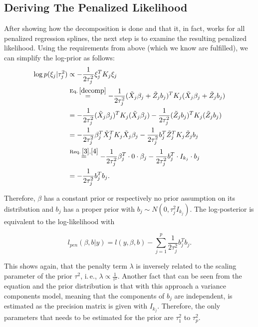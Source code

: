 \documentclass[12pt]{article}
\begin{document}
\subsection{Deriving The Penalized Likelihood}\label{likelihood}

After showing how the decomposition is done and that it, in fact, works for all penalized regression splines, the next step is to examine the resulting penalized likelihood. Using the requirements from above (which we know are fulfilled), we can simplify the log-prior as follows:
\vspace{1em}
\begin{align*}
\log p(\xi_j|\tau_j^2)  &\propto -\frac{1}{2\tau^2_j} \xi_j^TK_j \xi_j\\ 
&\overset{\text{Eq.}\:\ref{decomp}}{=} -\frac{1}{2\tau^2_j} (\tilde{X}_j \beta_j + \tilde{Z}_j b_j)^TK_j (\tilde{X}_j \beta_j + \tilde{Z}_j b_j) \\
&= -\frac{1}{2\tau^2_j} (\tilde{X}_j \beta_j)^TK_j (\tilde{X}_j \beta_j) 
-\frac{1}{2\tau^2_j} (\tilde{Z}_j b_j)^TK_j (\tilde{Z}_j b_j)\\
&= -\frac{1}{2\tau^2_j} \beta_j^T \tilde{X}_j^T K_j \tilde{X}_j \beta_j 
-\frac{1}{2\tau^2_j} b_j^T \tilde{Z}_j^T K_j \tilde{Z}_j b_j\\
&\overset{\text{Req.}\:\ref{3},\ref{4}}{=} -\frac{1}{2\tau^2_j} \beta_j^T \cdot 0 \cdot \beta_j 
-\frac{1}{2\tau^2_j} b_j^T \cdot I_{k_j} \cdot b_j\\
&= -\frac{1}{2\tau_j^2} b_j^T b_j.
\end{align*}


Therefore, $\beta$ has a constant prior or respectively no prior assumption on its distribution and $b_j$ has a proper prior with $b_j \sim N(0,\tau_j^2I_{k_j})$. The log-posterior is equivalent to the log-likelihood with

$$l_{pen}(\beta,b|y) = l(y,\beta,b) - \sum_{j=1}^p \frac{1}{2\tau_j^2} b_j^T  b_j. $$

This shows again, that the penalty term $\lambda$ is inversely related to the scaling parameter of the prior $\tau^2$, i.\,e., $\lambda \propto \frac{1}{\tau^2}$. Another fact that can be seen from the equation and the prior distribution is that with this approach a variance components model, meaning that the components of $b_j$ are independent, is estimated as the precision matrix is given with $I_{k_j}$. Therefore, the only parameters that needs to be estimated for the prior are $\tau^2_1$  to $\tau^2_p$.
\end{document}
